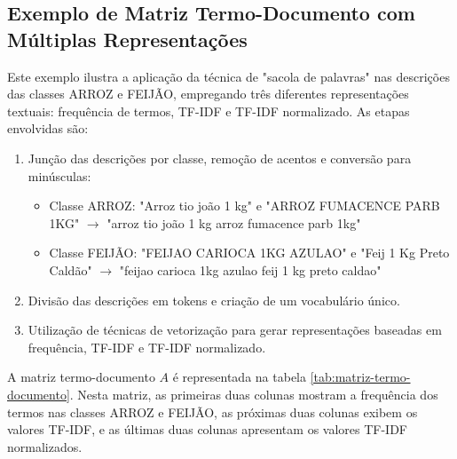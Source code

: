 \subsection{Exemplo de Matriz Termo-Documento com Múltiplas Representações}
\label{sec:exemplo-matriz-termo-documento-multiplas-representacoes}
Este exemplo ilustra a aplicação da técnica de "sacola de palavras" nas descrições das classes ARROZ e FEIJÃO, empregando três diferentes representações textuais: frequência de termos, TF-IDF e TF-IDF normalizado. As etapas envolvidas são:

\begin{enumerate}
    \item Junção das descrições por classe, remoção de acentos e conversão para minúsculas:
    \begin{itemize}
        \item Classe ARROZ: "Arroz tio joão 1 kg" e "ARROZ FUMACENCE PARB 1KG" $\rightarrow$ "arroz tio joão 1 kg arroz fumacence parb 1kg"
        \item Classe FEIJÃO: "FEIJAO CARIOCA 1KG AZULAO" e "Feij 1 Kg Preto Caldão" $\rightarrow$ "feijao carioca 1kg azulao feij 1 kg preto caldao"
    \end{itemize}
    \item Divisão das descrições em tokens e criação de um vocabulário único.
    \item Utilização de técnicas de vetorização para gerar representações baseadas em frequência, TF-IDF e TF-IDF normalizado.
\end{enumerate}

A matriz termo-documento \( A \) é representada na tabela \ref{tab:matriz-termo-documento}.  Nesta matriz, as primeiras duas colunas mostram a frequência dos termos nas classes ARROZ e FEIJÃO, as próximas duas colunas exibem os valores TF-IDF, e as últimas duas colunas apresentam os valores TF-IDF normalizados.

